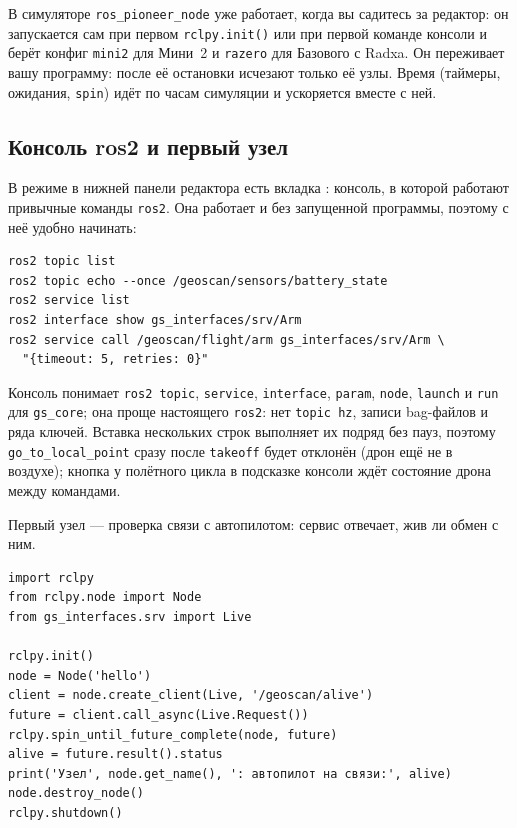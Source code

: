 \begin{infobox}
В симуляторе \texttt{ros\_pioneer\_node} уже работает, когда вы садитесь за редактор: он запускается сам при первом \verb|rclpy.init()| или при первой команде консоли и берёт конфиг \texttt{mini2} для Мини~2 и \texttt{razero} для Базового с Radxa. Он переживает вашу программу: после её остановки исчезают только её узлы. Время (таймеры, ожидания, \verb|spin|) идёт по часам симуляции и ускоряется вместе с ней.
\end{infobox}

\subsection{Консоль ros2 и первый узел}

В режиме  в нижней панели редактора есть вкладка : консоль, в которой работают привычные команды \verb|ros2|. Она работает и без запущенной программы, поэтому с неё удобно начинать:

\begin{codebox}
\begin{verbatim}
ros2 topic list
ros2 topic echo --once /geoscan/sensors/battery_state
ros2 service list
ros2 interface show gs_interfaces/srv/Arm
ros2 service call /geoscan/flight/arm gs_interfaces/srv/Arm \
  "{timeout: 5, retries: 0}"
\end{verbatim}
\end{codebox}

Консоль понимает \verb|ros2 topic|, \verb|service|, \verb|interface|, \verb|param|, \verb|node|, \verb|launch| и \verb|run| для \texttt{gs\_core}; она проще настоящего \verb|ros2|: нет \verb|topic hz|, записи bag-файлов и ряда ключей. Вставка нескольких строк выполняет их подряд без пауз, поэтому \verb|go_to_local_point| сразу после \verb|takeoff| будет отклонён (дрон ещё не в воздухе); кнопка  у полётного цикла в подсказке консоли ждёт состояние дрона между командами.

Первый узел --- проверка связи с автопилотом: сервис  отвечает, жив ли обмен с ним.

\begin{codebox}
\small
\begin{verbatim}
import rclpy
from rclpy.node import Node
from gs_interfaces.srv import Live

rclpy.init()
node = Node('hello')
client = node.create_client(Live, '/geoscan/alive')
future = client.call_async(Live.Request())
rclpy.spin_until_future_complete(node, future)
alive = future.result().status
print('Узел', node.get_name(), ': автопилот на связи:', alive)
node.destroy_node()
rclpy.shutdown()
\end{verbatim}
\end{codebox}

